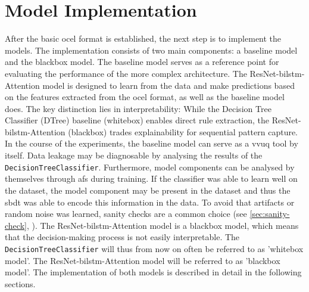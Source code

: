 \section{Model Implementation}

After the basic \gls{ocel} format is established, the next step is to implement the models. The implementation consists of two main components: a baseline model and the blackbox model. The baseline model serves as a reference point for evaluating the performance of the more complex architecture. The ResNet-\gls{bilstm}-Attention model is designed to learn from the data and make predictions based on the features extracted from the \gls{ocel} format, as well as the baseline model does. The key distinction lies in interpretability: While the Decision Tree Classifier (DTree) baseline (whitebox) enables direct rule extraction, the ResNet-\gls{bilstm}-Attention (blackbox) trades explainability for sequential pattern capture. In the course of the experiments, the baseline model can serve as a \gls{vvuq} tool by itself. Data leakage may be diagnosable by analysing the results of the \texttt{DecisionTreeClassifier}. Furthermore, model components can be analysed by themselves through \gls{afs} during training. If the classifier was able to learn well on the dataset, the model component may be present in the dataset and thus the \gls{sbdt} was able to encode this information in the data. To avoid that artifacts or random noise was learned, sanity checks are a common choice (see \autoref{sec:sanity-check}, \textcite{adebayo2018sanity}). The ResNet-\gls{bilstm}-Attention model is a blackbox model, which means that the decision-making process is not easily interpretable. The \texttt{DecisionTreeClassifier} will thus from now on often be referred to as 'whitebox model'. The ResNet-\gls{bilstm}-Attention model will be referred to as 'blackbox model'. The implementation of both models is described in detail in the following sections.

